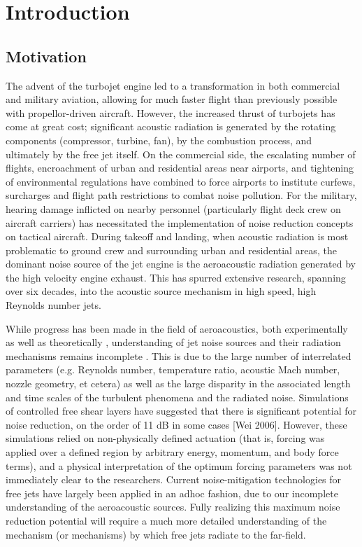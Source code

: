\chapter{Introduction}
\label{introduction}
\section{Motivation}
The advent of the turbojet engine led to a transformation in both commercial and military aviation, allowing for much faster flight than previously possible with propellor-driven aircraft. 
However, the increased thrust of turbojets has come at great cost; significant acoustic radiation is generated by the rotating components (compressor, turbine, fan), by the combustion process, and ultimately by the free jet itself. 
On the commercial side, the escalating number of flights, encroachment of urban and residential areas near airports, and tightening of environmental regulations have combined to force airports to institute curfews, surcharges and flight path restrictions to combat noise pollution. 
For the military, hearing damage inflicted on nearby personnel (particularly flight deck crew on aircraft carriers) has necessitated the implementation of noise reduction concepts on tactical aircraft.
During takeoff and landing, when acoustic radiation is most problematic to ground crew and  surrounding urban and residential areas, the dominant noise source of the jet engine is the aeroacoustic radiation generated by the high velocity engine exhaust.
This has spurred extensive research, spanning over six decades, into the acoustic source mechanism in high speed, high Reynolds number jets. 

While progress has been made in the field of aeroacoustics, both experimentally \citep{Tam1996, Viswanathan2006, Tam2008} as well as theoretically \citep{Cabana2008}, understanding of jet noise sources and their radiation mechanisms remains incomplete \citep{Jordan2008}.
This is due to the large number of interrelated parameters (e.g. Reynolds number, temperature ratio, acoustic Mach number, nozzle geometry, et cetera) as well as the large disparity in the associated length and time scales of the turbulent phenomena and the radiated noise.
Simulations of controlled free shear layers have suggested that there is significant potential for noise reduction, on the order of 11 dB in some cases [Wei 2006].
However, these simulations relied on non-physically defined actuation (that is, forcing was applied over a defined region by arbitrary energy, momentum, and body force terms), and a physical interpretation of the optimum forcing parameters was not immediately clear to the researchers.
Current noise-mitigation technologies for free jets have largely been applied in an adhoc fashion, due to our incomplete understanding of the aeroacoustic sources.
Fully realizing this maximum noise reduction potential will require a much more detailed understanding of the mechanism (or mechanisms) by which free jets radiate to the far-field.


